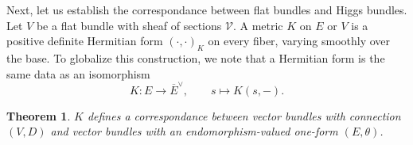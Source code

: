 \documentclass[letterpaper, 12pt]{article}
\newtheorem{theorem}{Theorem}
\theoremstyle{definition}
\begin{document}
Next, let us establish the correspondance between flat bundles and Higgs bundles. Let $V$ be a flat bundle with sheaf of sections $\mathcal{V}$. A metric \(K\) on $E$ or $V$ is a positive definite Hermitian form \( (\cdot, \cdot)_K\) on every fiber, varying smoothly over the base. To globalize this construction, we note that a Hermitian form is the same data as an isomorphism
\begin{equation}
    K: E \to \overline{E}^\vee,\qquad s \mapsto K(s, -).
\end{equation}


\begin{theorem} \label{D''-D-correspondance}
    $K$ defines a correspondance between vector bundles with connection $(V, D)$ and vector bundles with an endomorphism-valued one-form $(E, \theta)$.
\end{theorem}
\end{document}
